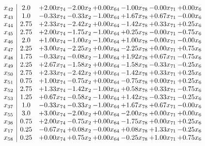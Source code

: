 \documentclass[8pt]{article}
\begin{document}
\[\begin{array}{c| c c@{\hskip 2pt} c@{\hskip 2pt} c@{\hskip 2pt} c@{\hskip 2pt} c@{\hskip 2pt} c@{\hskip 2pt} }
 x_{42}   &  2.0 & +  2.00 x_{74} & -2.00 x_{2} & +  0.00 x_{64} & -1.00 x_{78} & -0.00 x_{71} & +  0.00 x_{6}\\
 x_{43}   &  1.0 & -0.33 x_{74} & -0.33 x_{2} & -1.00 x_{64} & +  1.67 x_{78} & +  0.67 x_{71} & -0.00 x_{6}\\
 x_{44}   &  2.75 & +  2.33 x_{74} & -2.42 x_{2} & +  0.00 x_{64} & -1.42 x_{78} & +  0.33 x_{71} & +  0.25 x_{6}\\
 x_{45}   &  2.75 & +  2.00 x_{74} & -1.75 x_{2} & -1.00 x_{64} & +  0.25 x_{78} & -0.00 x_{71} & -0.75 x_{6}\\
 x_{46}   &  2.0 & +  1.00 x_{74} & -1.00 x_{2} & -1.00 x_{64} & +  1.00 x_{78} & -0.00 x_{71} & -0.00 x_{6}\\
 x_{47}   &  2.25 & +  3.00 x_{74} & -2.25 x_{2} & +  0.00 x_{64} & -2.25 x_{78} & +  0.00 x_{71} & +  0.75 x_{6}\\
 x_{48}   &  1.75 & -0.33 x_{74} & -0.08 x_{2} & -1.00 x_{64} & +  1.92 x_{78} & +  0.67 x_{71} & -0.75 x_{6}\\
 x_{49}   &  2.25 & +  2.67 x_{74} & -1.58 x_{2} & +  0.00 x_{64} & -1.58 x_{78} & -0.33 x_{71} & -0.25 x_{6}\\
 x_{50}   &  2.75 & +  2.33 x_{74} & -2.42 x_{2} & +  0.00 x_{64} & -1.42 x_{78} & +  0.33 x_{71} & +  0.25 x_{6}\\
 x_{51}   &  0.75 & +  1.00 x_{74} & -0.75 x_{2} & +  0.00 x_{64} & -0.75 x_{78} & +  0.00 x_{71} & +  0.25 x_{6}\\
 x_{52}   &  2.75 & +  1.33 x_{74} & -1.42 x_{2} & -1.00 x_{64} & +  0.58 x_{78} & +  0.33 x_{71} & -0.75 x_{6}\\
 x_{53}   &  1.25 & +  0.67 x_{74} & -0.58 x_{2} & -1.00 x_{64} & +  1.42 x_{78} & -0.33 x_{71} & -0.25 x_{6}\\
 x_{37}   &  1.0 & -0.33 x_{74} & -0.33 x_{2} & -1.00 x_{64} & +  1.67 x_{78} & +  0.67 x_{71} & -0.00 x_{6}\\
 x_{55}   &  3.0 & +  3.00 x_{74} & -2.00 x_{2} & +  0.00 x_{64} & -2.00 x_{78} & +  0.00 x_{71} & +  0.00 x_{6}\\
 x_{36}   &  0.75 & +  2.00 x_{74} & -0.75 x_{2} & +  0.00 x_{64} & -1.75 x_{78} & +  0.00 x_{71} & +  0.25 x_{6}\\
 x_{17}   &  0.25 & -0.67 x_{74} & +  0.08 x_{2} & -0.00 x_{64} & +  0.08 x_{78} & +  1.33 x_{71} & -0.25 x_{6}\\
 x_{58}   &  0.25 & +  0.00 x_{74} & +  0.75 x_{2} & +  0.00 x_{64} & -0.25 x_{78} & +  1.00 x_{71} & +  0.75 x_{6}\\

\end{array}\]
\end{document}
